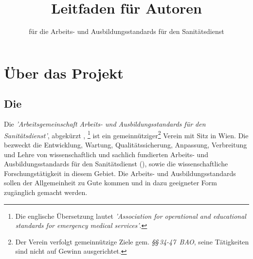 \documentclass[ngerman,paper=a4,fontsize=8pt,headings=small,draft=no,parskip=half,noonelinecaption]{scrreprt}
\title{Leitfaden für Autoren}
\subtitle{für die Arbeits- und Ausbildungsstandards für den
Sanitätsdienst}
\author{\AASS}
\begin{document}
 

\dominitoc
\maketitle
\tableofcontents
\listoffixmes


\chapter{Über das Projekt}

\section{Die \ARGE}



Die \emph{'Arbeitsgemeinschaft Arbeits- und
    Ausbildungsstandards für den Sanitätsdienst'}, abgekürzt {\ARGE},
    \footnote{Die englische Übersetzung lautet \emph{'Association for
    operational and
    educational standards for emergency medical services'}.}
    ist ein gemeinnütziger\footnote{Der Verein verfolgt gemeinnützige Ziele gem.
    \emph{\S\S\,34-47~BAO}, seine Tätigkeiten sind nicht auf Gewinn
    ausgerichtet.} Verein mit Sitz in Wien. 
    Die \ARGE{} bezweckt die Entwicklung, Wartung,
    Qualitätssicherung, Anpassung, Verbreitung und Lehre von wissenschaftlich und sachlich fundierten Arbeits- und
    Ausbildungsstandards für den Sanitätsdienst (\AASS{}), sowie
    die wissenschaftliche Forschungstätigkeit in diesem
    Gebiet. Die Arbeits- und Ausbildungsstandards sollen der
    Allgemeinheit zu Gute kommen und in dazu geeigneter Form
    zugänglich gemacht werden.
    
\end{document}

